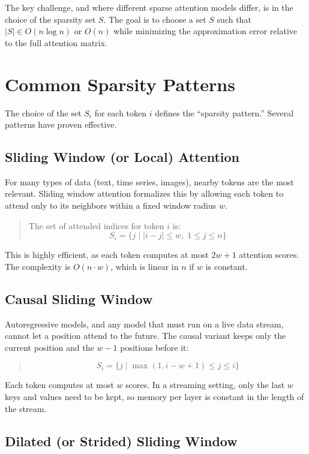 \documentclass{article}
\begin{document}
The key challenge, and where different sparse attention models differ, is in the choice of the sparsity set \(S\). The goal is to choose a set \(S\) such that \(|S| \in O(n \log n)\) or \(O(n)\) while minimizing the approximation error relative to the full attention matrix.

\section{Common Sparsity Patterns}

The choice of the set \(S_i\) for each token \(i\) defines the ``sparsity pattern.'' Several patterns have proven effective.

\subsection{Sliding Window (or Local) Attention}

For many types of data (text, time series, images), nearby tokens are the most relevant. Sliding window attention formalizes this by allowing each token to attend only to its neighbors within a fixed window radius \(w\).
\begin{quote}
The set of attended indices for token \(i\) is:
\[
S_i = \{j \mid |i - j| \le w, \; 1 \le j \le n \}
\]
\end{quote}
This is highly efficient, as each token computes at most \(2w+1\) attention scores. The complexity is \(O(n \cdot w)\), which is linear in \(n\) if \(w\) is constant.

\subsection{Causal Sliding Window}

Autoregressive models, and any model that must run on a live data stream, cannot let a position attend to the future. The causal variant keeps only the current position and the \(w - 1\) positions before it:
\begin{quote}
\[
S_i = \{j \mid \max(1, i - w + 1) \le j \le i \}
\]
\end{quote}
Each token computes at most \(w\) scores. In a streaming setting, only the last \(w\) keys and values need to be kept, so memory per layer is constant in the length of the stream.

\subsection{Dilated (or Strided) Sliding Window}
\end{document}

